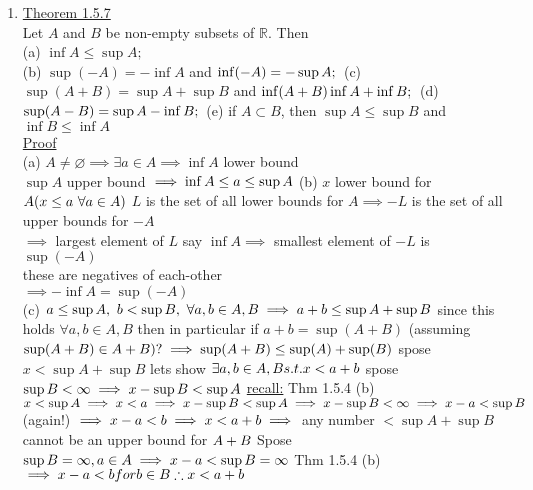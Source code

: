 \documentclass[12pt]{amsart}
\begin{document}
\begin{enumerate}
\item \underline{Theorem 1.5.7}\\
Let $A$ and $B$ be non-empty subsets of $\mathbb{R}$. Then\\
(a) $\inf A \leq \sup A;$\\
(b) $\sup(-A) = - \inf A$ and $\inf(-A) = - \sup A;\\$
(c) $\sup(A+B) = \sup A + \sup B$ and $\inf(A+B) \inf A + \inf B;\\$
(d) $\sup(A-B) = \sup A - \inf B;\\$
(e) if $A \subset B$, then $\sup A \leq \sup B$ and $\inf B \leq \inf A$\\
\underline{Proof}\\
(a) $A \neq \varnothing \implies \exists a \in A \implies \inf A$ lower bound\\
$\sup A$ upper bound $\implies \inf A \leq a \leq \sup A\\$
(b) $x$ lower bound for $A (x \leq a\,\, \forall a \in A)\\$
$L$ is the set of all lower bounds for $A \implies - L$ is the set of all upper bounds for $-A$\\
$\implies$ largest element of $L$ say $\inf A \implies$ smallest element of $-L$ is $\sup(-A)$\\
these are negatives of each-other\\
$\implies - \inf A = \sup(-A)$\\
(c) $a \leq \sup A,\,\, b < \sup B,\,\, \forall a,b \in A,B\\
\implies a + b \leq \sup A + \sup B\\$
since this holds $\forall a,b \in A, B$ then in particular if $a + b = \sup(A+B)$ (assuming $\sup(A+B) \in A+B) ?\\
\implies \sup(A+B) \leq \sup(A) + \sup (B)\\$
spose $x < \sup A + \sup B$ lets show $\exists a,b \in A, B s.t. x < a+b\\$
spose $\sup B < \infty \implies x- \sup B < \sup A\\$
\underline{recall:} Thm 1.5.4 (b) $x< \sup A \implies x < a \implies x- \sup B < \sup A \implies x - \sup B < \infty\\
\implies x-a < \sup B$ (again!) $\implies x-a < b\\
\implies x< a+b \implies$ any number $< \sup A + \sup B$ cannot be an upper bound for $A + B\\$
Spose $\sup B = \infty, a \in A \implies x-a < \sup B = \infty\\$
Thm 1.5.4 (b)  $\implies x-a<b for b \in B \\
\therefore x < a+b\\$



\end{enumerate}
\end{document}
